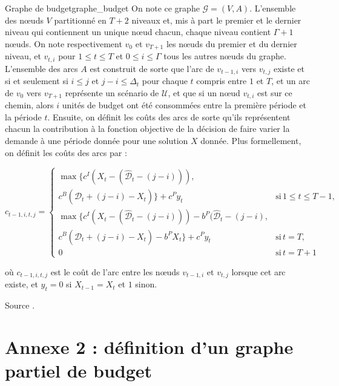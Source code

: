 \documentclass[12pt, a4paper, twoside]{article}
\numberwithin{equation}{section}
\begin{document}
    \begin{definition}{Graphe de budget}{graphe_budget}
		On note ce graphe $\mathcal{G}=(V, A)$. L'ensemble des nœuds $V$ partitionné en $T+2$ niveaux et, mis à part le premier et le dernier niveau qui contiennent un unique nœud chacun, chaque niveau contient $\Gamma +1$ nœuds. On note respectivement $v_0$ et $v_{T+1}$ les nœuds du premier et du dernier niveau, et $v_{t, i}$ pour $1\leq t\leq T$ et $0\leq i \leq \Gamma$ tous les autres nœuds du graphe. L'ensemble des arcs $A$ est construit de sorte que l'arc de $v_{t-1, i}$ vers $v_{t, j}$ existe et si et seulement si $i\leq j$ et $j-i\leq\Delta_t$ pour chaque $t$ compris entre $1$ et $T$, et un arc de $v_0$ vers $v_{T+1}$ représente un scénario de $\mathcal{U}$, et que si un nœud $v_{t, i}$ est sur ce chemin, alors $i$ unités de budget ont été consommées entre la première période et la période $t$. Ensuite, on définit les coûts des arcs de sorte qu'ils représentent chacun la contribution à la fonction objective de la décision de faire varier la demande à une période donnée pour une solution $X$ donnée. Plus formellement, on définit les coûts des arcs par :

   		\[
    		c_{t-1, i, t, j}=\left\{
    		\begin{array}{ll}
    			\max\{c^I(X_t-(\hat{\mathcal{D}}_t-(j-i))),\\
    			c^B(\hat{\mathcal{D}}_t+(j-i)-X_t)\} + c^Py_t & \text{si}\, 1\leq t\leq T-1,\\
    			\max\{c^I(X_t-(\hat{\mathcal{D}}_t-(j-i))) - b^P(\hat{\mathcal{D}}_t - (j-i), \\
    			c^B(\hat{\mathcal{D}}_t+(j-i)-X_t) - b^PX_t\} + c^Py_t & \text{si}\, t=T,\\
    			0 & \text{si}\, t=T+1
    		\end{array}
    		\right.
   		\]
        
		où $c_{t-1, i, t, j}$ est le coût de l'arc entre les nœuds $v_{t-1, i}$ et $v_{t, j}$ lorsque cet arc existe, et $y_t=0$ si $X_{t-1}=X_t$ et $1$ sinon.
        
        {\footnotesize
            \hrulefill
        
            Source \cite{guillaume2020robustproductionplanningbudgeted}.
        }
	\end{definition}


    \clearpage
    \section{Annexe 2 : définition d'un graphe partiel de budget}
    \label{section:annexe:def:graphe_partiel_budget}
    
\end{document}
